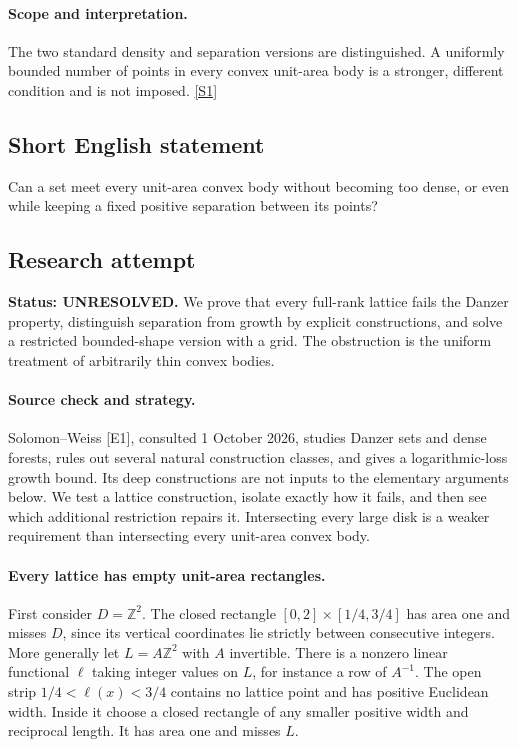 \documentclass[11pt,a4paper]{article}
\newcommand{\sref}[2]{\hyperlink{source:#1:#2}{[S#2]}}
\begin{document}
\paragraph{Scope and interpretation.}

The two standard density and separation versions are distinguished. A uniformly bounded number of points in every convex unit-area body is a stronger, different condition and is not imposed. \sref{1386}{1}

\subsection{Short English statement}

Can a set meet every unit-area convex body without becoming too dense, or even while keeping a fixed positive separation between its points?

\subsection{Research attempt}
\textbf{Status: UNRESOLVED.} We prove that every full-rank lattice fails the Danzer property, distinguish separation from growth by explicit constructions, and solve a restricted bounded-shape version with a grid. The obstruction is the uniform treatment of arbitrarily thin convex bodies.

\paragraph{Source check and strategy.}
Solomon--Weiss [E1], consulted 1 October 2026, studies Danzer sets and dense forests, rules out several natural construction classes, and gives a logarithmic-loss growth bound. Its deep constructions are not inputs to the elementary arguments below. We test a lattice construction, isolate exactly how it fails, and then see which additional restriction repairs it. Intersecting every large disk is a weaker requirement than intersecting every unit-area convex body.

\paragraph{Every lattice has empty unit-area rectangles.}
First consider $D=\mathbb Z^2$. The closed rectangle $[0,2]\times[1/4,3/4]$ has area one and misses $D$, since its vertical coordinates lie strictly between consecutive integers. More generally let $L=A\mathbb Z^2$ with $A$ invertible. There is a nonzero linear functional $\ell$ taking integer values on $L$, for instance a row of $A^{-1}$. The open strip $1/4<\ell(x)<3/4$ contains no lattice point and has positive Euclidean width. Inside it choose a closed rectangle of any smaller positive width and reciprocal length. It has area one and misses $L$.
\end{document}

